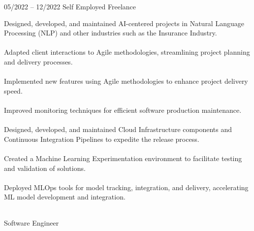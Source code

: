 \documentclass[9pt, green]{template/developercv} %
\begin{document}
{\begin{entrylist}
	\entry
	{05/2022 -- 12/2022 }
	{}
	{Self Employed \space\cpipe\space Freelance}
	{
		\vspace{0.3mm}
		\begin{minipage}[t]{0.75\textwidth}				
			\vspace{-\baselineskip}
            \itemmarker Designed, developed, and maintained AI-centered projects in Natural Language Processing (NLP) and other industries such as the Insurance Industry.\\
            \vspace{-3mm}\\
            \itemmarker Adapted client interactions to Agile methodologies, streamlining project planning and delivery processes.\\
            \vspace{-3mm}\\
            \itemmarker Implemented new features using Agile methodologies to enhance project delivery speed.\\
            \vspace{-3mm}\\
            \itemmarker Improved monitoring techniques for efficient software production maintenance.\\
            \vspace{-3mm}\\
            \itemmarker Designed, developed, and maintained Cloud Infrastructure components and Continuous Integration Pipelines to expedite the release process.\\
            \vspace{-3mm}\\
            \itemmarker Created a Machine Learning Experimentation environment to facilitate testing and validation of solutions.\\
            \vspace{-3mm}\\
            \itemmarker Deployed MLOps tools for model tracking, integration, and delivery, accelerating ML model development and integration.\\
            \vspace{-3mm}\\       
		\end{minipage}

	}
	{Software Engineer}


\end{entrylist}}
\end{document}
